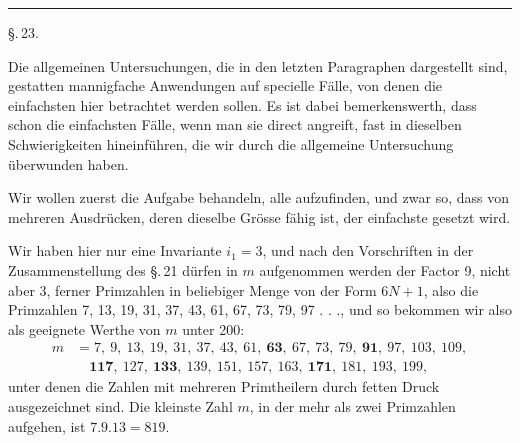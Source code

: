 \begin{center}
\end{center}

\begin{center}
\end{center}

\begin{center}
\rule{3cm}{0.4pt}
\end{center}

\begin{center}
\S.\,23.
\end{center}

\begin{center}
\end{center}

Die allgemeinen Untersuchungen, die in den letzten Paragraphen dargestellt sind, gestatten mannigfache Anwendungen auf specielle Fälle, von denen die einfachsten hier betrachtet werden sollen. Es ist dabei bemerkenswerth, dass schon die einfachsten Fälle, wenn man sie direct angreift, fast in dieselben Schwierigkeiten hineinführen, die wir durch die allgemeine Untersuchung überwunden haben.

Wir wollen zuerst die Aufgabe behandeln, alle  aufzufinden, und zwar so, dass von mehreren Ausdrücken, deren dieselbe Grösse fähig ist, der einfachste gesetzt wird.

Wir haben hier nur eine Invariante $i_1=3$, und nach den Vorschriften in der Zusammenstellung des \S.\,21 dürfen in $m$ aufgenommen werden der Factor 9, nicht aber 3, ferner Primzahlen in beliebiger Menge von der Form $6N+1$, also die Primzahlen 7, 13, 19, 31, 37, 43, 61, 67, 73, 79, 97 . . ., und so bekommen wir also als geeignete Werthe von $m$ unter 200:
\[
\begin{aligned}
m &= 7,\ 9,\ 13,\ 19,\ 31,\ 37,\ 43,\ 61,\ \mathbf{63},\ 67,\ 73,\ 79,\ \mathbf{91},\ 97,\ 103,\ 109,\\
&\quad \mathbf{117},\ 127,\ \mathbf{133},\ 139,\ 151,\ 157,\ 163,\ \mathbf{171},\ 181,\ 193,\ 199,
\end{aligned}
\]
unter denen die Zahlen mit mehreren Primtheilern durch fetten Druck ausgezeichnet sind. Die kleinste Zahl $m$, in der mehr als zwei Primzahlen aufgehen, ist $7.9.13=819$.
